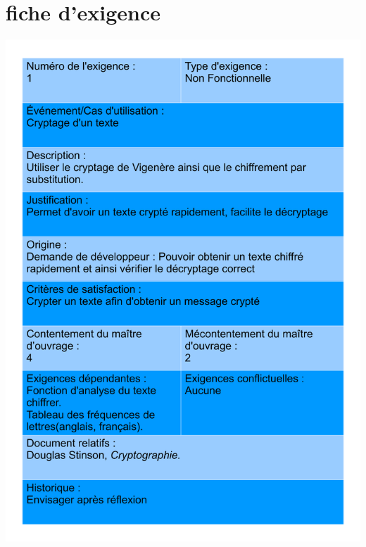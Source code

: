 \documentclass[a4]{article}
\begin{document}
		\section{fiche d'exigence}
				\includegraphics[scale=0.5,page = 1]{FichesExigences.pdf} \\
\end{document}
